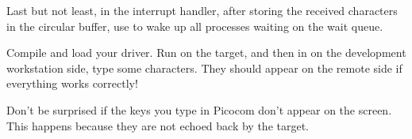 Last but not least, in the interrupt handler,
after storing the received characters in the circular buffer, use
 to wake up all processes waiting on the wait queue.

Compile and load your driver. Run 
on the target, and then in  on the development
workstation side, type some characters. They should appear on the
remote side if everything works correctly!

Don't be surprised if the keys you type in Picocom don't appear on the
screen. This happens because they are not echoed back by the target.
